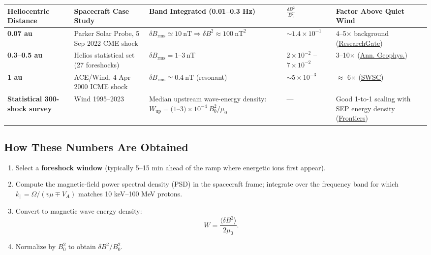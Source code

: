 \begin{center}
\renewcommand{\arraystretch}{1.5}
\begin{tabular}{@{}p{3.2cm} p{3.5cm} p{4.5cm} p{3.5cm} p{4.5cm}@{}}
\toprule
\textbf{Heliocentric Distance} & \textbf{Spacecraft Case Study} & \textbf{Band Integrated (0.01–0.3 Hz)} & $\displaystyle \frac{\delta B^2}{B_0^2}$ & \textbf{Factor Above Quiet Wind} \\
\midrule
\textbf{0.07 au} &
Parker Solar Probe, 5 Sep 2022 CME shock &
$\delta B_{\text{rms}} \simeq 10~\text{nT} \Rightarrow \delta B^2 \approx 100~\text{nT}^2$ &
$\sim 1.4 \times 10^{-1}$ &
4–5× background (\href{https://www.researchgate.net/publication/378250996_Properties_of_an_Interplanetary_Shock_Observed_at_007_and_07_au_by_Parker_Solar_Probe_and_Solar_Orbiter}{ResearchGate}) \\

\textbf{0.3–0.5 au} &
Helios statistical set (27 foreshocks) &
$\delta B_{\text{rms}} = 1$–$3~\text{nT}$ &
$2\times10^{-2}$ – $7\times10^{-2}$ &
3–10× (\href{https://angeo.copernicus.org/articles/22/2315/2004/angeo-22-2315-2004.pdf}{Ann. Geophys.}) \\

\textbf{1 au} &
ACE/Wind, 4 Apr 2000 ICME shock &
$\delta B_{\text{rms}} \simeq 0.4~\text{nT}$ (resonant) &
$\sim 5 \times 10^{-3}$ &
$\approx$ 6× (\href{https://www.swsc-journal.org/articles/swsc/full_html/2015/01/swsc140020/swsc140020.html}{SWSC}) \\

\textbf{Statistical 300-shock survey} &
Wind 1995–2023 &
Median upstream wave-energy density: $W_{\text{up}} = (1$–$3)\times10^{-4}~B_0^2/\mu_0$ &
— &
Good 1-to-1 scaling with SEP energy density (\href{https://www.frontiersin.org/articles/10.3389/fphy.2020.626768/full}{Frontiers}) \\
\bottomrule
\end{tabular}
\end{center}

\subsection*{How These Numbers Are Obtained}

\begin{enumerate}
  \item Select a \textbf{foreshock window} (typically 5–15 min ahead of the ramp where energetic ions first appear).
  \item Compute the magnetic-field power spectral density (PSD) in the spacecraft frame; integrate over the frequency band for which $k_\parallel = \Omega / (v\mu \mp V_A)$ matches 10 keV–100 MeV protons.
  \item Convert to magnetic wave energy density:
  \[
  W = \frac{\langle \delta B^2 \rangle}{2\mu_0}.
  \]
  \item Normalize by $B_0^2$ to obtain $\delta B^2 / B_0^2$.
\end{enumerate}


